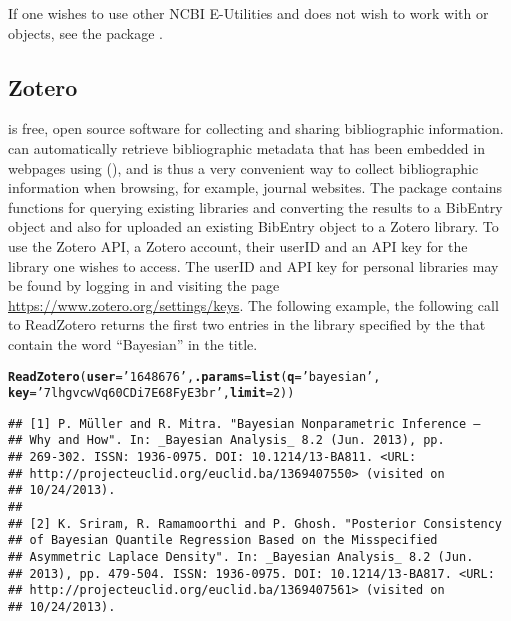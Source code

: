 \documentclass[article]{jss}\usepackage[]{graphicx}\usepackage[]{color}
\makeatletter
\newcommand{\hlnum}[1]{\textcolor[rgb]{0.125,0.125,1}{#1}}%
\newcommand{\hlstr}[1]{\textcolor[rgb]{0.125,0.125,1}{#1}}%
\newcommand{\hlstd}[1]{\textcolor[rgb]{0.251,0.251,0.282}{#1}}%
\newcommand{\hlkwc}[1]{\textcolor[rgb]{0.529,0,0.184}{\textbf{#1}}}%
\newcommand{\hlkwd}[1]{\textcolor[rgb]{0.251,0.251,0.282}{\textbf{#1}}}%
\newenvironment{kframe}{%
 \def\at@end@of@kframe{}%
 \ifinner\ifhmode%
  \def\at@end@of@kframe{\end{minipage}}%
  \begin{minipage}{\columnwidth}%
 \fi\fi%
 \def\FrameCommand##1{\hskip\@totalleftmargin \hskip-\fboxsep
 \colorbox{shadecolor}{##1}\hskip-\fboxsep
     \hskip-\linewidth \hskip-\@totalleftmargin \hskip\columnwidth}%
 \MakeFramed {\advance\hsize-\width
   \@totalleftmargin\z@ \linewidth\hsize
   \@setminipage}}%
 {\par\unskip\endMakeFramed%
 \at@end@of@kframe}
\newenvironment{knitrout}{}{} %
\newcommand{\ourpkg}{\pkg{RefManageR}}
\makeatother
\begin{document}
If one wishes to use other NCBI E-Utilities and does not wish to work with  or  objects, see the  package \citep{rentrez}.
\subsection{Zotero}
 is free, open source software for collecting and sharing bibliographic information.   can automatically retrieve bibliographic metadata that has been embedded in webpages using  (), and is thus a very convenient way to collect bibliographic information when browsing, for example, journal websites.  The \ourpkg{} package contains functions for querying existing  libraries and converting the results to a BibEntry object and also for uploaded an existing BibEntry object to a Zotero library.  To use the Zotero API, a Zotero account, their userID and an API key for the library one wishes to access.  The userID and API key for personal libraries may be found by logging in and visiting the page \url{https://www.zotero.org/settings/keys}.  The following example, the following call to ReadZotero returns the first two entries in the library specified by the  that contain the word ``Bayesian'' in the title.
\begin{knitrout}
\color{fgcolor}\begin{kframe}
\begin{alltt}
\hlkwd{ReadZotero}\hlstd{(}\hlkwc{user} \hlstd{=} \hlstr{'1648676'}\hlstd{,} \hlkwc{.params} \hlstd{=} \hlkwd{list}\hlstd{(}\hlkwc{q} \hlstd{=} \hlstr{'bayesian'}\hlstd{,}
                               \hlkwc{key} \hlstd{=} \hlstr{'7lhgvcwVq60CDi7E68FyE3br'}\hlstd{,} \hlkwc{limit} \hlstd{=} \hlnum{2}\hlstd{))}
\end{alltt}
\begin{verbatim}
## [1] P. Müller and R. Mitra. "Bayesian Nonparametric Inference –
## Why and How". In: _Bayesian Analysis_ 8.2 (Jun. 2013), pp.
## 269-302. ISSN: 1936-0975. DOI: 10.1214/13-BA811. <URL:
## http://projecteuclid.org/euclid.ba/1369407550> (visited on
## 10/24/2013).
## 
## [2] K. Sriram, R. Ramamoorthi and P. Ghosh. "Posterior Consistency
## of Bayesian Quantile Regression Based on the Misspecified
## Asymmetric Laplace Density". In: _Bayesian Analysis_ 8.2 (Jun.
## 2013), pp. 479-504. ISSN: 1936-0975. DOI: 10.1214/13-BA817. <URL:
## http://projecteuclid.org/euclid.ba/1369407561> (visited on
## 10/24/2013).
\end{verbatim}
\end{kframe}
\end{knitrout}
\end{document}
